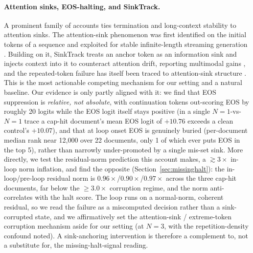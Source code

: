 \documentclass[11pt]{article}
\begin{document}
\paragraph{Attention sinks, EOS-halting, and SinkTrack.}
A prominent family of accounts ties termination and long-context stability to attention
sinks. The attention-sink phenomenon was first identified on the initial tokens of a
sequence and exploited for stable infinite-length streaming generation
\citep{xiao2024streaming}. Building on it, SinkTrack treats an anchor token as an
information sink and injects context into it to counteract attention drift, reporting
multimodal gains \citep{sinktrack2026}, and the repeated-token failure has itself been
traced to attention-sink structure \citep{repeatedtoken2025}. This is the most actionable
competing mechanism for our setting
and a natural baseline. Our evidence is only partly aligned with it: we find that EOS
suppression is \emph{relative, not absolute}, with continuation tokens out-scoring EOS by
roughly 20 logits while the EOS logit itself stays positive (in a single $N=1$-vs-$N=1$
trace a cap-hit document's mean
EOS logit of $+10.76$ exceeds a clean control's $+10.07$), and that at loop
onset EOS is genuinely buried (per-document median rank near 12{,}000 over 22 documents,
only 1 of which ever puts EOS in the top 5), rather than narrowly
under-promoted by a single mis-set sink. More directly, we test the residual-norm
prediction this account makes, a $\gtrsim 3\times$ in-loop norm inflation, and find
the opposite (Section~\ref{sec:missinghalt}): the in-loop/pre-loop residual norm is
$0.96\times$/$0.90\times$/$0.97\times$ across the three cap-hit documents, far below the
$\geq 3.0\times$ corruption regime, and the norm anti-correlates with the halt score. The
loop runs on a normal-norm, coherent residual, so we read the failure as a miscomputed
decision rather than a sink-corrupted state, and we affirmatively set the
attention-sink / extreme-token corruption mechanism aside for our setting (at $N=3$, with
the repetition-density confound noted). A sink-anchoring intervention is therefore a
complement to, not a substitute for, the missing-halt-signal reading.
\end{document}
